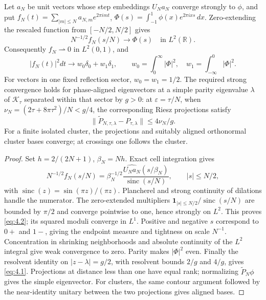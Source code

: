 \begin{theorem}\label{thm:packet}
Let $a_N$ be unit vectors whose step embeddings $U_Na_N$ converge
strongly to $\phi$, and put
$f_N(t)=\sum_{|m|\le N}a_{N,m}e^{2\pi imt}$,
$\Phi(s)=\int_{-1}^1\phi(x)e^{2\pi ixs}\,dx$.
Zero-extending the rescaled function from $[-N/2,N/2]$ gives
\begin{equation}\label{eq:4.2}
 N^{-1/2}f_N(s/N)\longrightarrow\Phi(s)\quad\text{in }L^2(\mathbb R).
\end{equation}
Consequently $f_N\rightharpoonup0$ in $L^2(0,1)$, and
\begin{equation}\label{eq:4.3}
 |f_N(t)|^2dt\longrightarrow w_0\delta_0+w_1\delta_1,\qquad
 w_0=\int_0^\infty|\Phi|^2,\quad w_1=\int_{-\infty}^0|\Phi|^2.
\end{equation}
For vectors in one fixed reflection sector, $w_0=w_1=1/2$.
The required strong convergence holds for phase-aligned eigenvectors
at a simple parity eigenvalue $\lambda$ of $\mathcal K_\tau$ separated
within that sector by $g>0$: at $\varepsilon=\tau/N$, when
$\nu_N=(2\tau+8\pi\tau^2)/N<g/4$, the corresponding
Riesz projections satisfy
\begin{equation}\label{eq:4.1}
\|\widetilde P_{N,\tau,\lambda}-P_{\tau,\lambda}\|\le4\nu_N/g.
\end{equation}
For a finite isolated cluster, the projections and suitably aligned
orthonormal cluster bases converge; at crossings one follows the cluster.
\end{theorem}
\begin{proof}
Set $h=2/(2N+1)$, $\beta_N=Nh$. Exact cell integration gives
\[
 N^{-1/2}f_N(s/N)=
 \beta_N^{-1/2}\frac{\widehat{U_Na_N}(s/\beta_N)}
 {\operatorname{sinc}(s/N)},\qquad |s|\le N/2,
\]
with $\operatorname{sinc}(z)=\sin(\pi z)/(\pi z)$.
Plancherel and strong continuity of dilations handle the numerator.
The zero-extended multipliers
$\mathbf1_{|s|\le N/2}/\operatorname{sinc}(s/N)$ are bounded by
$\pi/2$ and converge pointwise to one, hence strongly on $L^2$.
This proves \eqref{eq:4.2}; its squared moduli converge in $L^1$.
Positive and negative $s$ correspond to $0+$ and $1-$, giving the
endpoint measure and tightness on scale $N^{-1}$. Concentration in
shrinking neighborhoods and absolute continuity of the $L^2$ integral
give weak convergence to zero. Parity makes $|\Phi|^2$ even.
Finally the resolvent identity on $|z-\lambda|=g/2$, with resolvent
bounds $2/g$ and $4/g$, gives \eqref{eq:4.1}.
Projections at distance less than one have equal rank; normalizing
$\widetilde P_N\phi$ gives the simple eigenvector. For clusters,
the same contour argument followed by the near-identity unitary
between the two projections gives aligned bases.
\end{proof}

